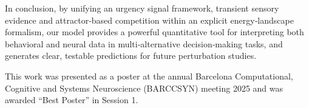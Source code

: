 In conclusion, by unifying an urgency signal framework, transient sensory evidence and attractor‐based competition within an explicit energy‐landscape formalism, our model provides a powerful quantitative tool for interpreting both behavioral and neural data in multi‐alternative decision‐making tasks, and generates clear, testable predictions for future perturbation studies.


This work was presented as a poster at the annual Barcelona Computational, Cognitive and Systems Neuroscience (BARCCSYN) meeting 2025 and was awarded “Best Poster” in Session 1.